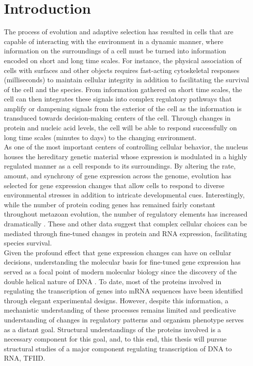 \chapter{Introduction}

\indent The process of evolution and adaptive selection has resulted in cells that are capable of interacting with the environment in a dynamic manner, where information on the surroundings of a cell must be turned into information encoded on short and long time scales. For instance, the physical association of cells with surfaces and other objects requires fast-acting cytoskeletal responses (milliseconds) to maintain cellular integrity in addition to facilitating the survival of the cell and the species. From information gathered on short time scales, the cell can then integrates these signals into complex regulatory pathways that amplify or dampening signals from the exterior of the cell as the information is transduced towards decision-making centers of the cell.  Through changes in protein and nucleic acid levels, the cell will be able to respond successfully on long time scales (minutes to days) to the changing environment.\\
\indent As one of the most important centers of controlling cellular behavior, the nucleus houses the hereditary genetic material whose expression is modulated in a highly regulated manner as a cell responds to its surroundings. By altering the rate, amount, and synchrony of gene expression across the genome, evolution has selected for gene expression changes that allow cells to respond to diverse environmental stresses in addition to intricate developmental cues. Interestingly, while the number of protein coding genes has remained fairly constant throughout metazoan evolution, the number of regulatory  elements has increased dramatically \cite{Levine_1710}. These and other data suggest that complex cellular choices can be mediated through fine-tuned changes in protein and RNA expression, facilitating species survival. \\
\indent Given the profound effect that gene expression changes can have on cellular decisions, understanding the molecular basis for fine-tuned gene expression has served as a focal point of modern molecular biology since the discovery of the double helical nature of DNA \cite{Watson_4017}. To date, most of the proteins involved in regulating the transcription of genes into mRNA sequences have been identified through elegant experimental designs.  However, despite this information, a mechanistic understanding of these processes remains limited and predicative understanding of changes in regulatory patterns and organism phenotype serves as a distant goal. Structural understandings of the proteins involved is a necessary component for this goal, and, to this end, this thesis will pursue structural studies of a major component regulating transcription of DNA to RNA, TFIID.

